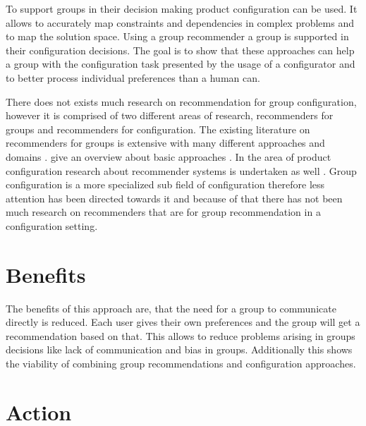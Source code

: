 To support groups in their decision making product configuration can be used. It allows to accurately map constraints and dependencies in complex problems and to map the solution space. Using a group recommender a group is supported in their configuration decisions. The goal is to show that these approaches can help a group with the configuration task presented by the usage of a configurator and to better process individual preferences than a human can.


There does not exists much research on recommendation for group configuration, however it is comprised of two different areas of research, recommenders for groups and recommenders for configuration.
The existing literature on recommenders for groups is extensive with many different approaches and domains \cite{delicResearchMethodsGroup2016, chenInterfaceInteractionDesign2011, atasItemRecommendationUsing2017, jamesonRecommendationGroups2007, chenEmpatheticonsDesigningEmotion2014, liuCGSPAComprehensiveGroup2019}. \citeauthor{felfernigGroupRecommenderSystems2018} give an overview about basic approaches \cite{felfernigGroupRecommenderSystems2018}.
In the area of product configuration research about recommender systems is undertaken as well \cite{pereiraFeatureBasedPersonalizedRecommender2016, scholzConfigurationbasedRecommenderSystem2017, scholzEffectsDecisionSpace2017}.
Group configuration is a more specialized sub field of configuration therefore less attention has been directed towards it and because of that there has not been much research on recommenders that are for group recommendation in a configuration setting.

\section{Benefits}
\label{sec:Introduction:Benefits}

The benefits of this approach are, that the need for a group to communicate directly is reduced. Each user gives their own preferences and the group will get a recommendation based on that. This allows to reduce problems arising in groups decisions like lack of communication and bias in groups. Additionally this shows the viability of combining group recommendations and configuration approaches.

\section{Action}
\label{sec:Introduction:Action}


